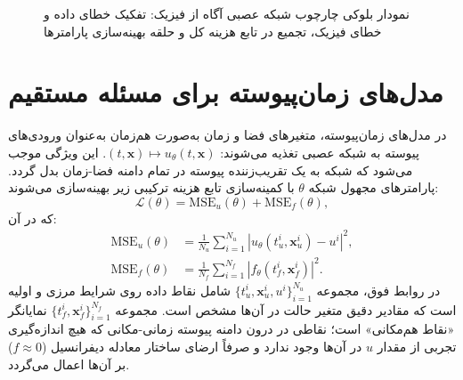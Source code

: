 \begin{figure}[t]
\begin{latin}
\end{latin}
\caption{نمودار بلوکی چارچوب شبکه عصبی آگاه از فیزیک: تفکیک خطای داده و خطای فیزیک، تجمیع در تابع هزینه کل و حلقه بهینه‌سازی پارامترها}
\label{fig:pinn}
\end{figure}

\section{مدل‌های زمان‌پیوسته برای مسئله مستقیم}
\label{sec:continuous}

در مدل‌های زمان‌پیوسته، متغیرهای فضا و زمان به‌صورت هم‌زمان به‌عنوان ورودی‌های پیوسته به شبکه عصبی تغذیه می‌شوند: $(t,\mathbf{x}) \mapsto u_\theta(t,\mathbf{x})$. این ویژگی موجب می‌شود که شبکه به یک تقریب‌زننده پیوسته در تمام دامنه فضا-زمان بدل گردد. پارامترهای مجهول شبکه $\theta$ با کمینه‌سازی تابع هزینه ترکیبی زیر بهینه‌سازی می‌شوند:
\begin{equation}
\mathcal{L}(\theta) = \mathrm{MSE}_u(\theta) + \mathrm{MSE}_f(\theta),
\label{eq:loss-forward}
\end{equation}
که در آن:
\begin{equation}
\begin{aligned}
\mathrm{MSE}_u(\theta) &= \frac{1}{N_u}\sum_{i=1}^{N_u} \left|u_\theta(t^i_u,\mathbf{x}^i_u) - u^i\right|^2, \\
\mathrm{MSE}_f(\theta) &= \frac{1}{N_f}\sum_{i=1}^{N_f} \left|f_\theta(t^i_f,\mathbf{x}^i_f)\right|^2.
\end{aligned}
\label{eq:loss-terms}
\end{equation}
در روابط فوق، مجموعه $\{t^i_u, \mathbf{x}^i_u, u^i\}_{i=1}^{N_u}$ شامل نقاط داده روی شرایط مرزی و اولیه است که مقادیر دقیق متغیر حالت در آن‌ها مشخص است. مجموعه $\{t^i_f, \mathbf{x}^i_f\}_{i=1}^{N_f}$ نمایانگر «نقاط هم‌مکانی» است؛ نقاطی در درون دامنه پیوسته زمانی-مکانی که هیچ اندازه‌گیری تجربی از مقدار $u$ در آن‌ها وجود ندارد و صرفاً ارضای ساختار معادله دیفرانسیل ($f \approx 0$) بر آن‌ها اعمال می‌گردد.

